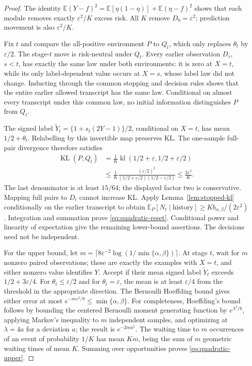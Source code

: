\begin{proof}
The identity
$\mathbb E(Y-f)^2=\mathbb E[\eta(1-\eta)]+\mathbb E(\eta-f)^2$
shows that each module removes exactly $\varepsilon^2/K$ excess risk.
All $K$ remove $D_0=\varepsilon^2$; prediction movement is also
$\varepsilon^2/K$.

Fix $t$ and compare the all-positive environment $P$ to $Q_t$, which only
replaces $\theta_t$ by $\varepsilon/2$. The stage-$t$ move is risk-neutral
under $Q_t$. Every earlier observation $D_s$, $s<t$, has exactly the same
law under both environments: it is zero at $X=t$, while its only
label-dependent value occurs at $X=s$, whose label law did not change.
Inducting through the common stopping and decision rules shows that the
entire earlier allowed transcript has the same law. Conditional on almost
every transcript under this common law, no initial information
distinguishes $P$ from $Q_t$.

The signed label $\widetilde Y_t=\{1+s_t(2Y-1)\}/2$, conditional on
$X=t$, has mean $1/2+\theta_t$. Relabelling by this invertible map
preserves KL. The one-sample full-pair divergence therefore satisfies
\begin{align*}
 \operatorname{KL}(P,Q_t)
 &=\frac1K\operatorname{kl}(1/2+\varepsilon,1/2+\varepsilon/2)\\
 &\le\frac1K\frac{(\varepsilon/2)^2}
                    {(1/2+\varepsilon/2)(1/2-\varepsilon/2)}
 \le\frac{2\varepsilon^2}{K}.
\end{align*}
The last denominator is at least $15/64$; the displayed factor two is
conservative. Mapping full pairs to $D_t$ cannot increase KL.
Apply Lemma~\ref{lem:stopped-kl} conditionally on the earlier transcript
to obtain $\mathbb E_P[N_t\mid\text{history}]
\ge Kb_{\alpha,\beta}/(2\varepsilon^2)$.
Integration and summation prove \eqref{eq:quadratic-reset}.
Conditional power and linearity of expectation give the remaining
lower-bound assertions. The decisions need not be independent.

For the upper bound, let
$m=\lceil8\varepsilon^{-2}\log(1/\min\{\alpha,\beta\})\rceil$.
At stage $t$, wait for $m$ nonzero paired observations; these are exactly
the examples with $X=t$, and either nonzero value identifies $Y$.
Accept if their mean signed label $\widetilde Y_t$ exceeds
$1/2+3\varepsilon/4$.
For $\theta_t\le\varepsilon/2$ and for $\theta_t=\varepsilon$, the mean
is at least $\varepsilon/4$ from the threshold in the appropriate
direction. The Bernoulli Hoeffding bound gives either error at most
$e^{-m\varepsilon^2/8}\le\min\{\alpha,\beta\}$.
For completeness, Hoeffding's bound follows by bounding the centered
Bernoulli moment generating function by $e^{\lambda^2/8}$,
applying Markov's inequality to $m$ independent samples, and optimizing
at $\lambda=4a$ for a deviation $a$; the result is $e^{-2ma^2}$.
The waiting time to $m$ occurrences of an event of probability $1/K$ has
mean $Km$, being the sum of $m$ geometric waiting times of mean $K$.
Summing over opportunities proves \eqref{eq:quadratic-upper}.
\end{proof}

